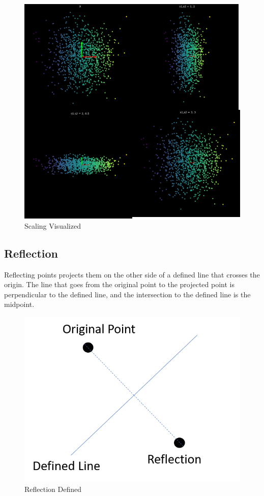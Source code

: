 \begin{figure}[h!]
\begin{center}
\includegraphics{labs/01/images/Scaling.png}
\caption{Scaling Visualized}
\label{fig:mon}
\end{center} 
\end{figure}


\subsection{Reflection}
Reflecting points projects them on the other side of a defined line that crosses the origin. 
The line that goes from the original point to the projected point is perpendicular to the defined line, and the intersection to the defined line is the midpoint.


\begin{figure}[h!]
\begin{center}
\includegraphics{labs/01/images/reflection_example.png}
\end{center} 
\caption{Reflection Defined}
\label{fig:mon}
\end{figure}


